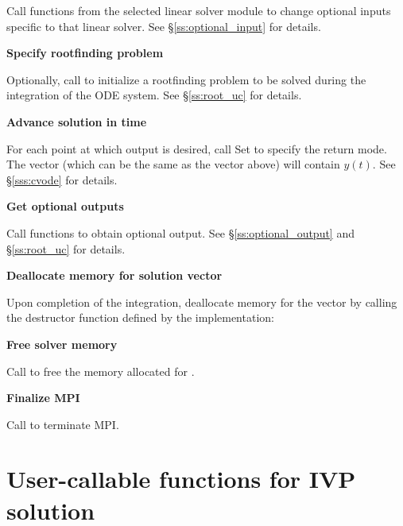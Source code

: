 \begin{Steps}
  Call  functions from the selected linear solver module to
  change optional inputs specific to that linear solver.
  See \S\ref{ss:optional_input} for details.

\item
  {\bf Specify rootfinding problem}

  Optionally, call  to initialize a rootfinding problem
  to be solved during the integration of the ODE system.
  See \S\ref{ss:root_uc} for details.

\item
  {\bf Advance solution in time}

  For each point at which output is desired, call
  Set  to specify the return mode.
  The vector  (which can be the same as
  the vector  above) will contain $y(t)$.
  See \S\ref{sss:cvode} for details.
  
\item
  {\bf Get optional outputs}

  Call  functions to obtain optional output.
  See \S\ref{ss:optional_output} and \S\ref{ss:root_uc} for details.

\item
  {\bf Deallocate memory for solution vector}

  Upon completion of the integration, deallocate memory for the vector 
  by calling the destructor function defined by the {\nvector} implementation:

  {\s} 

  {\p} 
  
\item
  {\bf Free solver memory}

  Call  to free the memory allocated for {\cvodes}.
  
\item 
  {\bf {\p} Finalize MPI}

  Call  to terminate MPI.
  
\end{Steps}

\section{User-callable functions for IVP solution}
\label{ss:cvodes_fct_sim}

